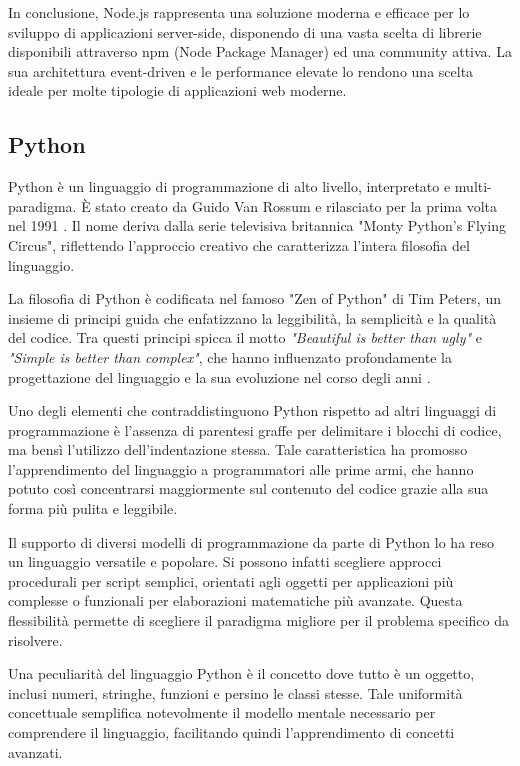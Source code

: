 In conclusione, Node.js rappresenta una soluzione moderna e efficace per lo sviluppo di applicazioni server-side, disponendo di una vasta scelta di librerie disponibili attraverso npm (Node Package Manager) ed una community attiva. La sua architettura event-driven e le performance elevate lo rendono una scelta ideale per molte tipologie di applicazioni web moderne.

\subsection{Python}

Python è un linguaggio di programmazione di alto livello, interpretato e multi-paradigma. È stato creato da Guido Van Rossum e rilasciato per la prima volta nel 1991 \citep{van_rossum_1995}. Il nome deriva dalla serie televisiva britannica "Monty Python's Flying Circus", riflettendo l'approccio creativo che caratterizza l'intera filosofia del linguaggio.

La filosofia di Python è codificata nel famoso "Zen of Python" di Tim Peters, un insieme di principi guida che enfatizzano la leggibilità, la semplicità e la qualità del codice. Tra questi principi spicca il motto \textit{"Beautiful is better than ugly"} e \textit{"Simple is better than complex"}, che hanno influenzato profondamente la progettazione del linguaggio e la sua evoluzione nel corso degli anni \citep{peters_2004}.

Uno degli elementi che contraddistinguono Python rispetto ad altri linguaggi di programmazione è l'assenza di parentesi graffe per delimitare i blocchi di codice, ma bensì l'utilizzo dell'indentazione stessa. Tale caratteristica ha promosso l'apprendimento del linguaggio a programmatori alle prime armi, che hanno potuto così concentrarsi maggiormente sul contenuto del codice grazie alla sua forma più pulita e leggibile.

Il supporto di diversi modelli di programmazione da parte di Python lo ha reso un linguaggio versatile e popolare. Si possono infatti scegliere approcci procedurali per script semplici, orientati agli oggetti per applicazioni più complesse o funzionali per elaborazioni matematiche più avanzate. Questa flessibilità permette di scegliere il paradigma migliore per il problema specifico da risolvere.

Una peculiarità del linguaggio Python è il concetto dove tutto è un oggetto, inclusi numeri, stringhe, funzioni e persino le classi stesse. Tale uniformità concettuale semplifica notevolmente il modello mentale necessario per comprendere il linguaggio, facilitando quindi l'apprendimento di concetti avanzati.

